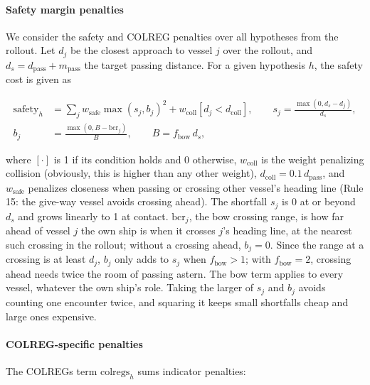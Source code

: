 \documentclass[10pt,a4paper]{article}
\begin{document}
\paragraph{Safety margin penalties}

We consider the safety and COLREG penalties over all hypotheses from the rollout. Let $d_j$
be the closest approach to vessel $j$ over the rollout, and $d_s = d_{\text{pass}} + m_{\text{pass}}$
the target passing distance. For a given hypothesis $h$, the safety cost is given as

\begin{align}
  \text{safety}_h &= 
    \sum_j w_{\text{safe}}\max(s_j, b_j)^2 + w_{\text{coll}}[d_j < d_{\text{coll}}],\qquad s_j = \frac{\max(0, d_s - d_j)}{d_s},\\
  b_j &= \frac{\max(0, B - \text{bcr}_j)}{B},\qquad B = f_{\text{bow}}\, d_s,
\end{align}

where $[\cdot]$ is 1 if its condition holds and 0 otherwise, $w_{\text{coll}}$ is the weight penalizing collision
(obviously, this is higher than any other weight), $d_{\text{coll}} = 0.1\,d_{\text{pass}}$, and
$w_\text{safe}$ penalizes closeness when passing or crossing other vessel's heading line (Rule 15: the give-way vessel
avoids crossing ahead). The shortfall $s_j$ is 0 at or beyond $d_s$ and grows linearly to 1 at contact.
$\text{bcr}_j$, the bow crossing range, is how far ahead of vessel $j$ the own ship is when it crosses $j$'s
heading line, at the nearest such crossing in the rollout; without a crossing ahead, $b_j = 0$.
Since the range at a crossing is at least $d_j$, $b_j$ only adds to $s_j$ when $f_{\text{bow}} > 1$; with
$f_{\text{bow}} = 2$, crossing ahead needs twice the room of passing astern. The bow term applies to every
vessel, whatever the own ship's role. Taking the larger of $s_j$ and $b_j$ avoids counting one encounter twice,
and squaring it keeps small shortfalls cheap and large ones expensive.


\paragraph{COLREG-specific penalties}
The COLREGs term
$\text{colregs}_h$ sums indicator penalties:
\end{document}
